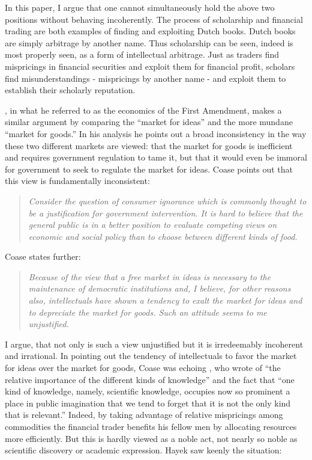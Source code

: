 \documentclass[11pt,]{article}
\begin{document}
In this paper, I argue that one cannot simultaneously hold the above two
positions without behaving incoherently. The process of scholarship and
financial trading are both examples of finding and exploiting Dutch
books. Dutch books are simply arbitrage by another name. Thus
scholarship can be seen, indeed is most properly seen, as a form of
intellectual arbitrage. Just as traders find mispricings in financial
securities and exploit them for financial profit, scholars find
misunderstandings - mispricings by another name - and exploit them to
establish their scholarly reputation.

\citet{Coase1974}, in what he referred to as the economics of the First
Amendment, makes a similar argument by comparing the ``market for
ideas'' and the more mundane ``market for goods.'' In his analysis he
points out a broad inconsistency in the way these two different markets
are viewed: that the market for goods is inefficient and requires
government regulation to tame it, but that it would even be immoral for
government to seek to regulate the market for ideas. Coase points out
that this view is fundamentally inconsistent:

\begin{quote}
\emph{Consider the question of consumer ignorance which is commonly
thought to be a justification for government intervention. It is hard to
believe that the general public is in a better position to evaluate
competing views on economic and social policy than to choose between
different kinds of food.}
\end{quote}

Coase states further:

\begin{quote}
\emph{Because of the view that a free market in ideas is necessary to
the maintenance of democratic institutions and, I believe, for other
reasons also, intellectuals have shown a tendency to exalt the market
for ideas and to depreciate the market for goods. Such an attitude seems
to me unjustified.}
\end{quote}

I argue, that not only is such a view unjustified but it is irredeemably
incoherent and irrational. In pointing out the tendency of intellectuals
to favor the market for ideas over the market for goods, Coase was
echoing \citet{Hayek1945}, who wrote of ``the relative importance of the
different kinds of knowledge'' and the fact that ``one kind of
knowledge, namely, scientific knowledge, occupies now so prominent a
place in public imagination that we tend to forget that it is not the
only kind that is relevant.'' Indeed, by taking advantage of relative
mispricings among commodities the financial trader benefits his fellow
men by allocating resources more efficiently. But this is hardly viewed
as a noble act, not nearly so noble as scientific discovery or academic
expression. Hayek saw keenly the situation:
\end{document}
